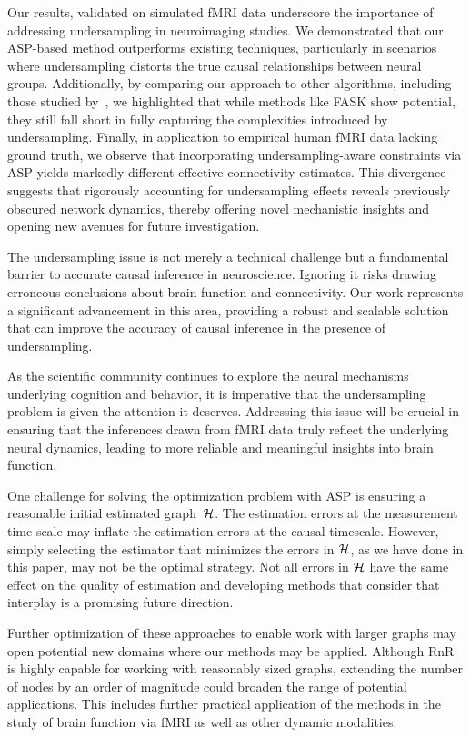 Our results, validated on  simulated fMRI data underscore the importance of addressing undersampling in neuroimaging studies. We demonstrated that our ASP-based method outperforms existing techniques, particularly in scenarios where undersampling distorts the true causal relationships between neural groups. Additionally, by comparing our approach to other algorithms, including those studied by~\citet{sanchez2019estimating}, we highlighted that while methods like FASK show potential, they still fall short in fully capturing the complexities introduced by undersampling. Finally, in application to empirical human fMRI data lacking ground truth, we observe that incorporating undersampling-aware constraints via ASP yields markedly different effective connectivity estimates. This divergence suggests that rigorously accounting for undersampling effects reveals previously obscured network dynamics, thereby offering novel mechanistic insights and opening new avenues for future investigation.

The undersampling issue is not merely a technical challenge but a fundamental barrier to accurate causal inference in neuroscience. Ignoring it risks drawing erroneous conclusions about brain function and connectivity. Our work represents a significant advancement in this area, providing a robust and scalable solution that can improve the accuracy of causal inference in the presence of undersampling.

As the scientific community continues to explore the neural mechanisms underlying cognition and behavior, it is imperative that the undersampling problem is given the attention it deserves. Addressing this issue will be crucial in ensuring that the inferences drawn from fMRI data truly reflect the underlying neural dynamics, leading to more reliable and meaningful insights into brain function.


One challenge for solving the optimization problem with ASP is ensuring a reasonable initial estimated graph~$\cal{H}$. The estimation errors at the
measurement time-scale may inflate the estimation errors at the causal
timescale. However, simply selecting the estimator that minimizes the
errors in $\cal{H}$, as we have done in this paper, may not be the
optimal strategy. Not all errors in $\cal{H}$ have the same effect on
the quality of estimation and developing methods that consider that
interplay is a promising future direction.

Further optimization of these approaches to enable work with larger graphs may open potential new domains where our methods may be applied. Although RnR is highly capable for working with reasonably sized graphs, extending the number of nodes by an order of magnitude could broaden the range of potential applications. This includes further practical application of the methods in the study of brain function via fMRI as well as other dynamic modalities.





